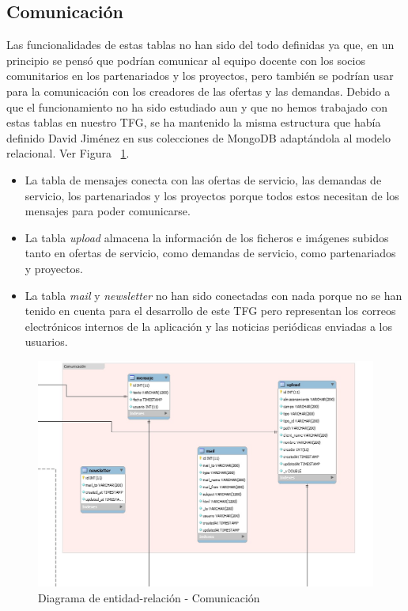 \documentclass[11pt]{book}
\begin{document}
\subsection{Comunicación}
Las funcionalidades de estas tablas no han sido del todo definidas ya que, en un principio se pensó que podrían comunicar al equipo docente con los socios comunitarios en los partenariados y los proyectos, pero también se podrían usar para la comunicación con los creadores de las ofertas y las demandas. Debido a que el funcionamiento no ha sido estudiado aun y que no hemos trabajado con estas tablas en nuestro TFG, se ha mantenido la misma estructura que había definido David Jiménez en sus colecciones de MongoDB adaptándola al modelo relacional. Ver Figura ~\ref{fig:comunicacion}. 
\begin{itemize} 
	\item La tabla de mensajes conecta con las ofertas de servicio, las demandas de servicio, los partenariados y los proyectos porque todos estos necesitan de los mensajes para poder comunicarse.
	\item La tabla \textit{upload} almacena la información de los ficheros e imágenes subidos tanto en ofertas de servicio, como demandas de servicio, como partenariados y proyectos.
	\item La tabla \textit{mail} y \textit{newsletter} no han sido conectadas con nada porque no se han tenido en cuenta para el desarrollo de este TFG pero representan los correos electrónicos internos de la aplicación y las noticias periódicas enviadas a los usuarios.
\end{itemize}
\begin{figure}[t]
	\centering
	\includegraphics[scale=0.4]{comunicacion}
	\caption{Diagrama de entidad-relación - Comunicación}
	\label{fig:comunicacion}
\end{figure}
\end{document}
